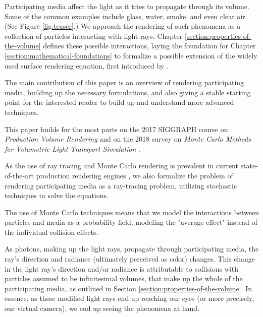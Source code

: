 
Participating media affect the light as it tries to propagate through its volume. Some of the common examples include glass, water, smoke, and even clear air. (See Figure \ref{fig:teaser}.) We approach the rendering of such phenomena as a collection of particles interacting with light rays. Chapter \ref{section:properties-of-the-volume}
defines these possible interactions, laying the foundation for Chapter 
\ref{section:mathematical-foundations}
to formalize a possible extension of the widely used surface rendering 
equation, first introduced by \cite{Kaj86}. 

The main contribution of this paper is an overview of rendering participating media, building up the necessary formulations, and also giving a stable starting point for the interested reader to build up and understand more advanced techniques. 

This paper builds for the most parts on the 2017 SIGGRAPH course on \textit{Production
Volume Rendering} \cite{SG17} and on the 2018 survey on 
\textit{Monte Carlo Methods for Volumetric Light Transport Simulation} \cite{Novak18}.

As the use of ray tracing and Monte Carlo rendering is prevalent in current state-of-the-art production rendering engines \cite{SG17}, we also formalize the problem of rendering participating media as a ray-tracing problem, utilizing stochastic techniques to solve the equations.

The use of Monte Carlo techniques means that we model the interactions between particles and media as a probability field, modeling the "average effect" instead of the individual collision effects.

As photons, making up the light rays, propagate through participating media,
the ray's direction and radiance (ultimately perceived as color) changes.
This change in the light ray's direction and/or radiance is attributable
to collisions with particles assumed to be infinitesimal volumes, that make up
the whole of the participating media, as outlined in Section 
\ref{section:properties-of-the-volume}.
In essence, as these modified light rays end up reaching our eyes (or more 
precisely, our virtual camera), we end up seeing the phenomena at hand.

